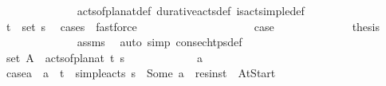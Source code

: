 \begin{isabellebody}
\ \ \ \ \ \ \ \ \ \ \ \ \isamarkupfalse%
\ acts{\isacharunderscore}{\kern0pt}of{\isacharunderscore}{\kern0pt}plan{\isacharunderscore}{\kern0pt}at{\isacharunderscore}{\kern0pt}def\ durative{\isacharunderscore}{\kern0pt}acts{\isacharunderscore}{\kern0pt}def\ is{\isacharunderscore}{\kern0pt}act{\isacharunderscore}{\kern0pt}simple{\isacharunderscore}{\kern0pt}def\isanewline
\ \ \ \ \ \ \ \ \ \ \ \ \isamarkupfalse%
\ {\isacartoucheopen}{\isacharparenleft}{\kern0pt}t\isactrlsub {\isasympi}{\isacharcomma}{\kern0pt}{\isasympi}{\isacharparenright}{\kern0pt}\ {\isasymin}\ set\ {\isasympi}s{\isacartoucheclose}\ \isamarkupfalse%
\ {\isacharparenleft}{\kern0pt}cases\ {\isasympi}{\isacharparenright}{\kern0pt}\ fastforce{\isacharplus}{\kern0pt}\isanewline
\ \ \ \ \ \ \ \ \isamarkupfalse%
\isanewline
\ \ \ \ \ \ \ \ \ \ \isamarkupfalse%
\ {\isacharquery}{\kern0pt}case{}\isanewline
\ \ \ \ \ \ \ \ \ \ \isamarkupfalse%
\ \isamarkupfalse%
\ {\isacharquery}{\kern0pt}thesis\isanewline
\ \ \ \ \ \ \ \ \ \ \ \ \isamarkupfalse%
\ assms\ \isamarkupfalse%
\ {\isacharparenleft}{\kern0pt}auto\ simp{\isacharcolon}{\kern0pt}\ consec{\isacharunderscore}{\kern0pt}htps{\isacharunderscore}{\kern0pt}def{\isacharparenright}{\kern0pt}\isanewline
\ \ \ \ \ \ \ \ \isamarkupfalse%
\isanewline
\ \ \ \ \ \ \isamarkupfalse%
\isanewline
\ \ \isamarkupfalse%
\isanewline
\ \ \ \ \isamarkupfalse%
\ {\isachardoublequoteopen}set\ A\ {\isasymsupseteq}\ acts{\isacharunderscore}{\kern0pt}of{\isacharunderscore}{\kern0pt}plan{\isacharunderscore}{\kern0pt}at\ t\ {\isasympi}s{\isachardoublequoteclose}\isanewline
\ \ \ \ \isamarkupfalse%
\isanewline
\ \ \ \ \ \ \isamarkupfalse%
\ a\isanewline
\ \ \ \ \ \ \isamarkupfalse%
\ {\isacharquery}{\kern0pt}case{}{\isacharequal}{\kern0pt}{\isachardoublequoteopen}a\ {\isasymin}\ {\isacharbraceleft}{\kern0pt}a\isactrlsub {\isasympi}{\isachardot}{\kern0pt}\ {\isasymexists}{\isasympi}{\isachardot}{\kern0pt}\ {\isacharparenleft}{\kern0pt}t{\isacharcomma}{\kern0pt}{\isasympi}{\isacharparenright}{\kern0pt}\ {\isasymin}\ simple{\isacharunderscore}{\kern0pt}acts\ {\isasympi}s\ {\isasymand}\ Some\ a\isactrlsub {\isasympi}\ {\isacharequal}{\kern0pt}\ res{\isacharunderscore}{\kern0pt}inst\ {\isasympi}\ At{\isacharunderscore}{\kern0pt}Start{\isacharbraceright}{\kern0pt}{\isachardoublequoteclose}\isanewline

\end{isabellebody}
